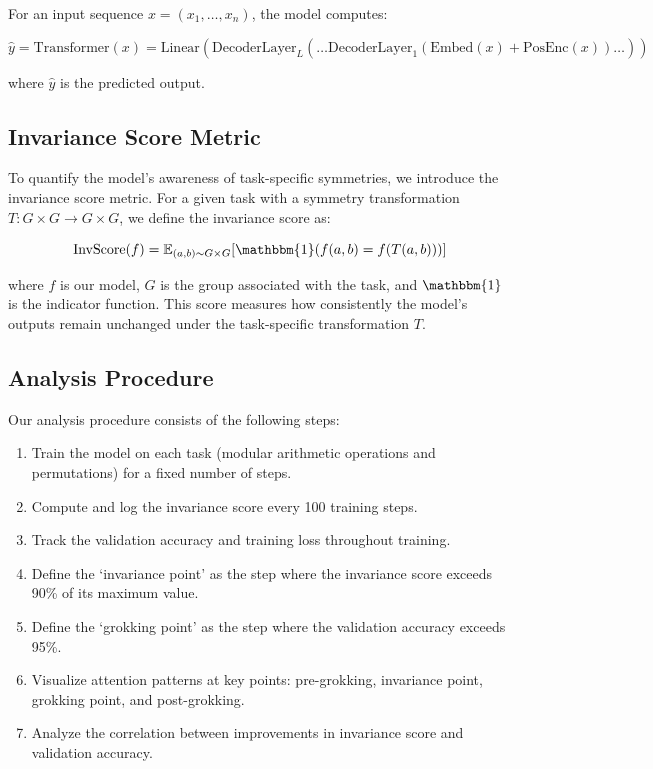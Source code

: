 \documentclass{article} %
\begin{document}
For an input sequence $x = (x_1, \ldots, x_n)$, the model computes:

\begin{equation}
    \hat{y} = \text{Transformer}(x) = \text{Linear}(\text{DecoderLayer}_L(\ldots \text{DecoderLayer}_1(\text{Embed}(x) + \text{PosEnc}(x))\ldots))
\end{equation}

where $\hat{y}$ is the predicted output.

\subsection{Invariance Score Metric}
To quantify the model's awareness of task-specific symmetries, we introduce the invariance score metric. For a given task with a symmetry transformation $T: G \times G \rightarrow G \times G$, we define the invariance score as:

\begin{equation}
    \text{InvScore}(f) = \mathbb{E}_{(a,b) \sim G \times G} [\mathbbm{1}(f(a,b) = f(T(a,b)))]
\end{equation}

where $f$ is our model, $G$ is the group associated with the task, and $\mathbbm{1}$ is the indicator function. This score measures how consistently the model's outputs remain unchanged under the task-specific transformation $T$.

\subsection{Analysis Procedure}
Our analysis procedure consists of the following steps:

\begin{enumerate}
    \item Train the model on each task (modular arithmetic operations and permutations) for a fixed number of steps.
    \item Compute and log the invariance score every 100 training steps.
    \item Track the validation accuracy and training loss throughout training.
    \item Define the `invariance point' as the step where the invariance score exceeds 90\% of its maximum value.
    \item Define the `grokking point' as the step where the validation accuracy exceeds 95\%.
    \item Visualize attention patterns at key points: pre-grokking, invariance point, grokking point, and post-grokking.
    \item Analyze the correlation between improvements in invariance score and validation accuracy.
\end{enumerate}
\end{document}
